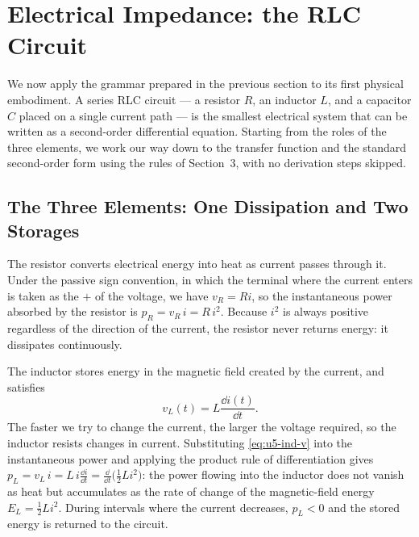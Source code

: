 \section{Electrical Impedance: the RLC Circuit}
\label{sec:u5-electric}

We now apply the grammar prepared in the previous section to its first
physical embodiment.
A series RLC circuit --- a resistor $R$, an inductor $L$, and a capacitor
$C$ placed on a single current path --- is the smallest electrical system
that can be written as a second-order differential equation.
Starting from the roles of the three elements, we work our way down to the
transfer function and the standard second-order form using the rules of
Section~3, with no derivation steps skipped.

\subsection{The Three Elements: One Dissipation and Two Storages}

The resistor converts electrical energy into heat as current passes through
it.
Under the passive sign convention, in which the terminal where the current
enters is taken as the $+$ of the voltage, we have $v_R = R i$, so the
instantaneous power absorbed by the resistor is $p_R = v_R\,i = R\,i^2$.
Because $i^2$ is always positive regardless of the direction of the
current, the resistor never returns energy: it dissipates continuously.

The inductor stores energy in the magnetic field created by the current,
and satisfies
\begin{equation}
  v_L(t) = L\frac{\dd i(t)}{\dd t}.
  \label{eq:u5-ind-v}
\end{equation}
The faster we try to change the current, the larger the voltage required,
so the inductor resists changes in current.
Substituting \eqref{eq:u5-ind-v} into the instantaneous power and applying
the product rule of differentiation gives
$p_L = v_L\,i = L\,i\frac{\dd i}{\dd t}
= \frac{\dd}{\dd t}\bigl(\tfrac{1}{2}L i^2\bigr)$:
the power flowing into the inductor does not vanish as heat but
accumulates as the rate of change of the magnetic-field energy
$E_L = \frac{1}{2}Li^2$.
During intervals where the current decreases, $p_L<0$ and the stored
energy is returned to the circuit.

